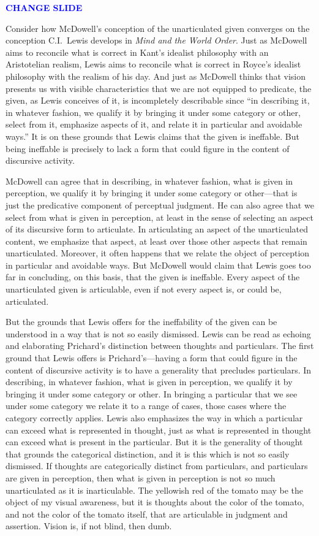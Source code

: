 \documentclass[12pt]{article}
\newcommand{\change}{\textcolor{blue}{\textbf{CHANGE SLIDE}}}
\begin{document}
\change

Consider how McDowell's conception of the unarticulated given converges on the conception C.I.\ Lewis develops in \emph{Mind and the World Order}. Just as McDowell aims to reconcile what is correct in Kant's idealist philosophy with an Aristotelian realism, Lewis aims to reconcile what is correct in Royce's idealist philosophy with the realism of his day. And just as McDowell thinks that vision presents us with visible characteristics that we are not equipped to predicate, the given, as Lewis conceives of it, is incompletely describable since ``in describing it, in whatever fashion, we qualify it by bringing it under some category or other, select from it, emphasize aspects of it, and relate it in particular and avoidable ways.'' It is on these grounds that Lewis claims that the given is ineffable. But being ineffable is precisely to lack a form that could figure in the content of discursive activity.

McDowell can agree that in describing, in whatever fashion, what is given in perception, we qualify it by bringing it under some category or other---that is just the predicative component of perceptual judgment. He can also agree that we select from what is given in perception, at least in the sense of selecting an aspect of its discursive form to articulate. In articulating an aspect of the unarticulated content, we emphasize that aspect, at least over those other aspects that remain unarticulated. Moreover, it often happens that we relate the object of perception in particular and avoidable ways. But McDowell would claim that Lewis goes too far in concluding, on this basis, that the given is ineffable. Every aspect of the unarticulated given is articulable, even if not every aspect is, or could be, articulated.

But the grounds that Lewis offers for the ineffability of the given can be understood in a way that is not so easily dismissed. Lewis can be read as echoing and elaborating Prichard's distinction between thoughts and particulars. The first ground that Lewis offers is Prichard's---having a form that could figure in the content of discursive activity is to have a generality that precludes particulars. In describing, in whatever fashion, what is given in perception, we qualify it by bringing it under some category or other. In bringing a particular that we see under some category we relate it to a range of cases, those cases where the category correctly applies. Lewis also emphasizes the way in which a particular can exceed what is represented in thought, just as what is represented in thought can exceed what is present in the particular. But it is the generality of thought that grounds the categorical distinction, and it is this which is not so easily dismissed. If thoughts are categorically distinct from particulars, and particulars are given in perception, then what is given in perception is not so much unarticulated as it is inarticulable. The yellowish red of the tomato may be the object of my visual awareness, but it is thoughts about the color of the tomato, and not the color of the tomato itself, that are articulable in judgment and assertion. Vision is, if not blind, then dumb.
\end{document}
